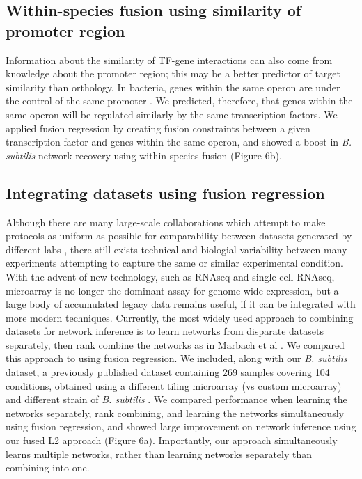 \documentclass[11pt]{article}
\begin{document}
\subsection{Within-species fusion using similarity of promoter region}
Information about the similarity of TF-gene interactions can also come from knowledge about the promoter region; this may be a better predictor of target similarity than orthology. In bacteria, genes within the same operon are under the control of the same promoter \cite{lawrence_shared_2002}. We predicted, therefore, that genes within the same operon will be regulated similarly by the same transcription factors. We applied fusion regression by creating fusion constraints between a given transcription factor and genes within the same operon, and showed a boost in \textit{B. subtilis} network recovery using within-species fusion (Figure 6b). 

\subsection{Integrating datasets using fusion regression}
Although there are many large-scale collaborations which attempt to make protocols as uniform as possible for comparability between datasets generated by different labs \cite{paten_nih_2015,kundaje_integrative_2015}, there still exists technical and biologial variability between many experiments attempting to capture the same or similar experimental condition. With the advent of new technology, such as RNAseq and single-cell RNAseq, microarray is no longer the dominant assay for genome-wide expression, but a large body of accumulated legacy data remains useful, if it can be integrated with more modern techniques. Currently, the most widely used approach to combining datasets for network inference is to learn networks from disparate datasets separately, then rank combine the networks as in Marbach et al \cite{marbach_revealing_2010}. We compared this approach to using fusion regression. We included, along with our \textit{B. subtilis} dataset, a previously published dataset containing 269 samples covering 104 conditions, obtained using a different tiling microarray (vs custom microarray) and different strain of \textit{B. subtilis} \cite{nicolas2012condition}. We compared performance when learning the networks separately, rank combining, and learning the networks simultaneously using fusion regression, and showed large improvement on network inference using our fused L2 approach (Figure 6a). Importantly, our approach simultaneously learns multiple networks, rather than learning networks separately than combining into one. 
\end{document}
